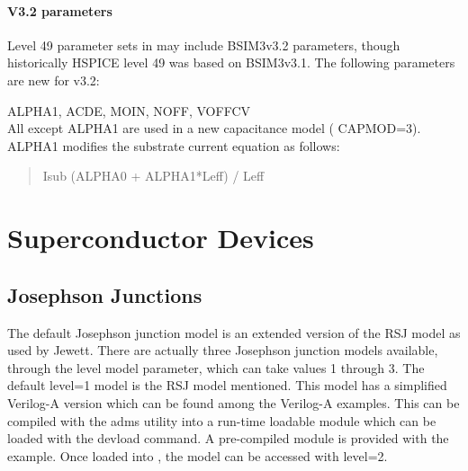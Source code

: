 \paragraph{V3.2 parameters}

Level 49 parameter sets in {\WRspice} may include BSIM3v3.2
parameters, though historically HSPICE level 49 was based on
BSIM3v3.1.  The following parameters are new for v3.2:

\begin{description}
\item{{\vt ALPHA1}, {\vt ACDE}, {\vt MOIN}, {\vt NOFF}, {\vt VOFFCV}}\\
 All except {\vt ALPHA1} are used in a new capacitance model ({\vt
 CAPMOD=3}).  {\vt ALPHA1} modifies the substrate current equation as
 follows:
\begin{quote}
 {\vt Isub  (ALPHA0 + ALPHA1*Leff) / Leff}
\end{quote}
\end{description}


\newpage
\section{Superconductor Devices}

\subsection{Josephson Junctions}



The default Josephson junction model is an extended version of the RSJ
model as used by Jewett\cite{jewett}.  There are actually three
Josephson junction models available, through the {\vt level} model
parameter, which can take values 1 through 3.  The default {\vt
level=1} model is the RSJ model mentioned.  This model has a
simplified Verilog-A version which can be found among the Verilog-A
examples.  This can be compiled with the {\vt adms} utility into a
run-time loadable module which can be loaded with the {\cb devload}
command.  A pre-compiled module is provided with the example.  Once
loaded into {\WRspice}, the model can be accessed with {\vt level=2}.

